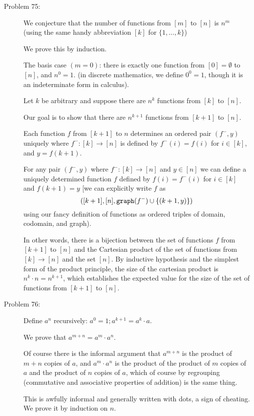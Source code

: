 \documentclass[12pt]{article}
\begin{document}
\begin{description}

\item[Problem 75:]  We conjecture that the number of functions from $[m]$ to $[n]$ is $n^m$ (using the same handy abbreviation $[k]$ for $\{1,\ldots,k\}$)

We prove this by induction.

The basis case $(m=0)$:  there is exactly one function from $[0] = \emptyset$ to $[n]$, and $n^0=1$.  (in discrete mathematics, we define $0^0=1$, though it is an indeterminate form in calculus).

Let $k$ be arbitrary and suppose there are $n^k$ functions from $[k]$ to $[n]$.

Our goal is to show that there are $n^{k+1}$ functions from $[k+1]$ to $[n]$.

Each function $f$ from $[k+1]$ to $n$ determines an ordered pair $(f^-,y)$ uniquely where
$f^-:[k] \rightarrow [n]$ is defined by $f^-(i)=f(i)$ for $i \in [k]$, and $y=f(k+1)$.

For any pair $(f^-,y)$ where $f^-:[k] \rightarrow [n]$ and $y \in [n]$ we can define a uniquely determined
function $f$ defined by $f(i) = f^-(i)$ for $i \in [k]$ and $f(k+1) = y$ [we can explicitly write $f$ as
$$([k+1],[n],{\tt graph}(f^-) \cup \{(k+1,y)\})$$ using our fancy definition of functions as ordered triples of domain, codomain, and graph).

In other words, there is a bijection between the set of functions $f$ from $[k+1]$ to $[n]$ and the 
Cartesian product of the set of functions from $[k] \rightarrow [n]$ and the set $[n]$.  By inductive hypothesis
and the simplest form of the product principle, the size of the cartesian product is $n^k \cdot n = n^{k+1}$,
which establishes the expected value for the size of the set of functions from $[k+1]$ to $[n]$.

\item[Problem 76:]  Define $a^n$ recursively:  $a^0 = 1;  a^{k+1}=a^k\cdot a$.

We prove that $a^{m+n}=a^m \cdot a^n$.

Of course there is the informal argument that $a^{m+n}$ is the product of $m+n$ copies of $a$,
and $a^m \cdot a^n$ is the product of the product of $m$ copies of $a$ and the product of $n$ copies of $a$, which of course by regrouping (commutative and associative properties of addition) is the same thing.

This is awfully informal and generally written with dots, a sign of cheating.  We prove it by induction on $n$.


\end{description}
\end{document}
